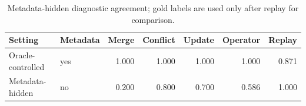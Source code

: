 \begin{table}[t]
\caption{Metadata-hidden diagnostic agreement; gold labels are used only after replay for comparison.}
\label{tab:metadata-hidden}
\begin{tabular*}{\hsize}{@{\extracolsep{\fill}}llrrrrr@{}}
\toprule
Setting & Metadata & Merge & Conflict & Update & Operator & Replay\\
\midrule
Oracle-controlled & yes & 1.000 & 1.000 & 1.000 & 1.000 & 0.871\\
Metadata-hidden & no & 0.200 & 0.800 & 0.700 & 0.586 & 1.000\\
\bottomrule
\end{tabular*}
\end{table}
